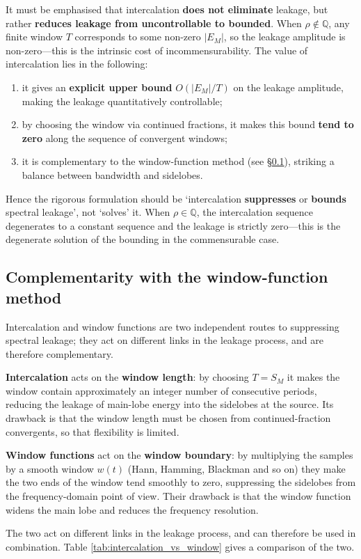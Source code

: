 \begin{remark}\label{rem:bounded_not_eliminated}
It must be emphasised that intercalation \textbf{does not eliminate} leakage, but rather \textbf{reduces leakage from uncontrollable to bounded}. When $\rho\notin\mathbb{Q}$, any finite window $T$ corresponds to some non-zero $|E_M|$, so the leakage amplitude is non-zero---this is the intrinsic cost of incommensurability. The value of intercalation lies in the following:
\begin{enumerate}[label=(\roman*)]
    \item it gives an \textbf{explicit upper bound} $O(|E_M|/T)$ on the leakage amplitude, making the leakage quantitatively controllable;
    \item by choosing the window via continued fractions, it makes this bound \textbf{tend to zero} along the sequence of convergent windows;
    \item it is complementary to the window-function method (see \S \ref{subsec:intercalation_vs_window}), striking a balance between bandwidth and sidelobes.
\end{enumerate}
Hence the rigorous formulation should be `intercalation \textbf{suppresses} or \textbf{bounds} spectral leakage', not `solves' it. When $\rho\in\mathbb{Q}$, the intercalation sequence degenerates to a constant sequence and the leakage is strictly zero---this is the degenerate solution of the bounding in the commensurable case.
\end{remark}

\subsection{Complementarity with the window-function method}\label{subsec:intercalation_vs_window}

Intercalation and window functions are two independent routes to suppressing spectral leakage; they act on different links in the leakage process, and are therefore complementary.

\begin{remark}\label{rem:two_routes_division}
\textbf{Intercalation} acts on the \textbf{window length}: by choosing $T=S_M$ it makes the window contain approximately an integer number of consecutive periods, reducing the leakage of main-lobe energy into the sidelobes at the source. Its drawback is that the window length must be chosen from continued-fraction convergents, so that flexibility is limited.

\textbf{Window functions} act on the \textbf{window boundary}: by multiplying the samples by a smooth window $w(t)$ (Hann, Hamming, Blackman and so on) they make the two ends of the window tend smoothly to zero, suppressing the sidelobes from the frequency-domain point of view. Their drawback is that the window function widens the main lobe and reduces the frequency resolution.

The two act on different links in the leakage process, and can therefore be used in combination. Table \ref{tab:intercalation_vs_window} gives a comparison of the two.
\end{remark}


